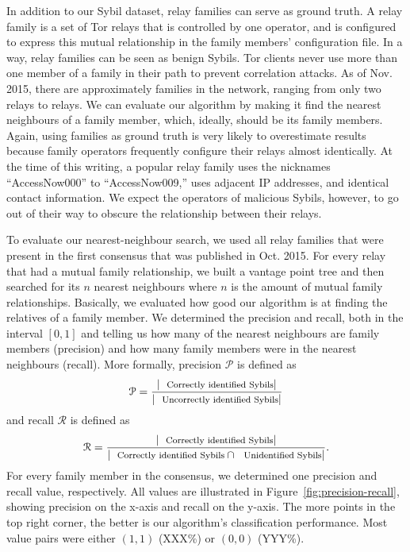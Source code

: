 In addition to our Sybil dataset, relay families can serve as ground truth.  A
relay family is a set of Tor relays that is controlled by one operator, and is
configured to express this mutual relationship in the family members'
configuration file.  In a way, relay families can be seen as benign Sybils.  Tor
clients never use more than one member of a family in their path to prevent
correlation attacks.  As of Nov.  2015, there are approximately 
families in the network, ranging from only two relays to  relays.
We can evaluate our algorithm by making it find the nearest neighbours of a
family member, which, ideally, should be its family members.  Again, using
families as ground truth is very likely to overestimate results because family
operators frequently configure their relays almost identically.  At the time of
this writing, a popular relay family uses the nicknames ``AccessNow000'' to
``AccessNow009,'' uses adjacent IP addresses, and identical contact information.
We expect the operators of malicious Sybils, however, to go out of their way to
obscure the relationship between their relays.

To evaluate our nearest-neighbour search, we used all relay families that were
present in the first consensus that was published in Oct. 2015.   For every relay that had a mutual
family relationship, we built a vantage point tree and then searched for its $n$
nearest neighbours where $n$ is the amount of mutual family relationships.
Basically, we evaluated how good our algorithm is at finding the relatives of a
family member.  We determined the precision and recall, both in the interval
$[0,1]$ and telling us how many of the nearest neighbours are family members
(precision) and how many family members were in the nearest neighbours (recall).
More formally, precision $\mathcal{P}$ is defined as
$$\mathcal{P} = \frac{|\textrm{\footnotesize Correctly identified Sybils}|}
{|\textrm{\footnotesize Uncorrectly identified Sybils}|}$$
and recall $\mathcal{R}$ is defined as
$$\mathcal{R} = \frac{|\textrm{\footnotesize Correctly identified Sybils}|}
{|\textrm{\footnotesize Correctly identified Sybils} \cap \textrm{\footnotesize Unidentified Sybils}|}.$$
For every family member in the consensus, we determined one precision and recall
value, respectively.  All values are illustrated in
Figure~\ref{fig:precision-recall}, showing precision on the x-axis and recall on
the y-axis.  The more points in the top right corner, the better is our
algorithm's classification performance.  Most value pairs were either $(1,1)$
(XXX\%) or $(0,0)$ (YYY\%).

